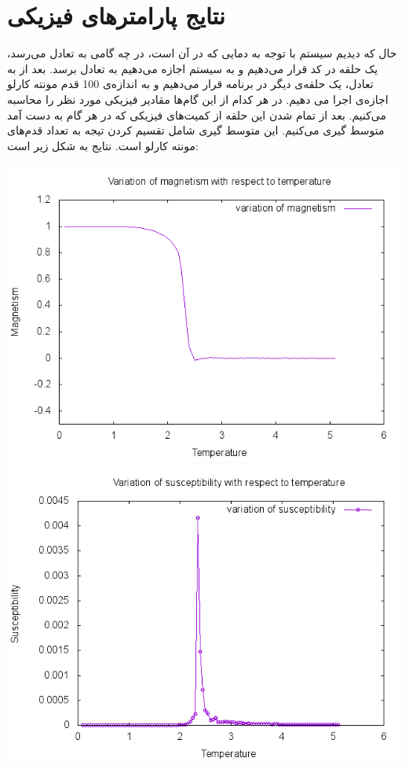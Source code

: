 \documentclass[a4paper,12pt]{article}
\begin{document}
\section{نتایج پارامترها‌ی فیزیكی}
حال که دیدیم سیستم با توجه به دمایی که در آن است، در چه گامی به
تعادل می‌رسد، یک حلقه در کد قرار می‌دهیم و به سیستم اجازه
می‌دهیم به تعادل برسد.
بعد از به تعادل، یک حلقه‌ی دیگر در برنامه قرار می‌دهیم
و به اندازه‌ی 100 قدم مونته کارلو اجازه‌ی اجرا می دهیم.
در هر کدام از این گام‌ها مقادیر فیزیكی مورد نظر را محاسبه می‌کنیم.
بعد از تمام شدن این حلقه از کمیت‌های فیزیکی که در هر گام به دست آمد متوسط گیری می‌کنیم.
این متوسط گیری شامل تقسیم کردن تیجه به تعداد قدم‌های مونته کارلو است.
نتایج به شکل زیر است:
\begin{center}
 \includegraphics[scale=.8]{MPT.png}
\includegraphics[scale=.8]{SUS.png}

\end{center}
\end{document}
